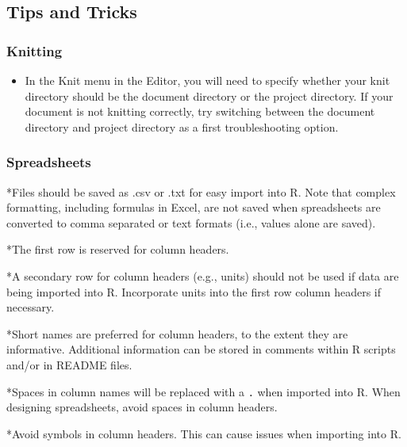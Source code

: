 \documentclass[]{article}
\providecommand{\tightlist}{%
  \setlength{\itemsep}{0pt}\setlength{\parskip}{0pt}}
\begin{document}
\hypertarget{tips-and-tricks}{%
\subsection{Tips and Tricks}\label{tips-and-tricks}}

\hypertarget{knitting}{%
\subsubsection{Knitting}\label{knitting}}

\begin{itemize}
\tightlist
\item
  In the Knit menu in the Editor, you will need to specify whether your
  knit directory should be the document directory or the project
  directory. If your document is not knitting correctly, try switching
  between the document directory and project directory as a first
  troubleshooting option.
\end{itemize}

\hypertarget{spreadsheets}{%
\subsubsection{Spreadsheets}\label{spreadsheets}}

*Files should be saved as .csv or .txt for easy import into R. Note that
complex formatting, including formulas in Excel, are not saved when
spreadsheets are converted to comma separated or text formats (i.e.,
values alone are saved).

*The first row is reserved for column headers.

*A secondary row for column headers (e.g., units) should not be used if
data are being imported into R. Incorporate units into the first row
column headers if necessary.

*Short names are preferred for column headers, to the extent they are
informative. Additional information can be stored in comments within R
scripts and/or in README files.

*Spaces in column names will be replaced with a \texttt{.} when imported
into R. When designing spreadsheets, avoid spaces in column headers.

*Avoid symbols in column headers. This can cause issues when importing
into R.
\end{document}
